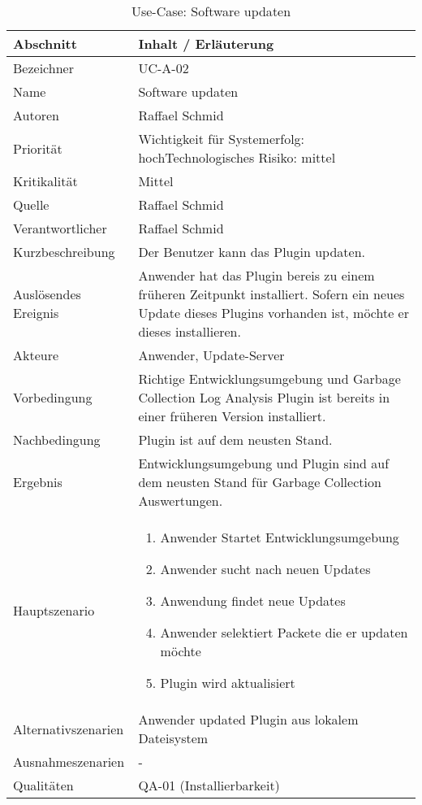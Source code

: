 \begin{longtable}{|p{4cm}|p{10.5cm}|}
\caption{Use-Case: Software updaten}\\\hline
   \textbf{Abschnitt} & \textbf{Inhalt / Erläuterung} \\\hline
   Bezeichner & UC-A-02\\\hline
   Name & Software updaten\\\hline
   Autoren & Raffael Schmid\\\hline
   Priorität & Wichtigkeit für Systemerfolg: hoch\newline Technologisches Risiko: mittel\\\hline
   Kritikalität & Mittel\\\hline
   Quelle & Raffael Schmid\\\hline
   Verantwortlicher & Raffael Schmid\\\hline
   Kurzbeschreibung & Der Benutzer kann das Plugin updaten.\\\hline
   Auslösendes Ereignis & Anwender hat das Plugin bereis zu einem früheren Zeitpunkt installiert. Sofern ein neues Update dieses Plugins vorhanden ist, möchte er dieses installieren.\\\hline
   Akteure & Anwender, Update-Server\\\hline
   Vorbedingung & Richtige Entwicklungsumgebung und Garbage Collection Log Analysis Plugin ist bereits in einer früheren Version installiert.\\\hline
   Nachbedingung & Plugin ist auf dem neusten Stand.\\\hline
   Ergebnis & Entwicklungsumgebung und Plugin sind auf dem neusten Stand für Garbage Collection Auswertungen.\\\hline
   Hauptszenario & 
	\begin{enumerate}
		\item Anwender Startet Entwicklungsumgebung
		\item Anwender sucht nach neuen Updates
		\item Anwendung findet neue Updates
		\item Anwender selektiert Packete die er updaten möchte
		\item Plugin wird aktualisiert
	\end{enumerate}
	\\\hline
   Alternativszenarien & Anwender updated Plugin aus lokalem Dateisystem\\\hline
   Ausnahmeszenarien & -\\\hline
   Qualitäten & QA-01 (Installierbarkeit)\\\hline
\end{longtable}

